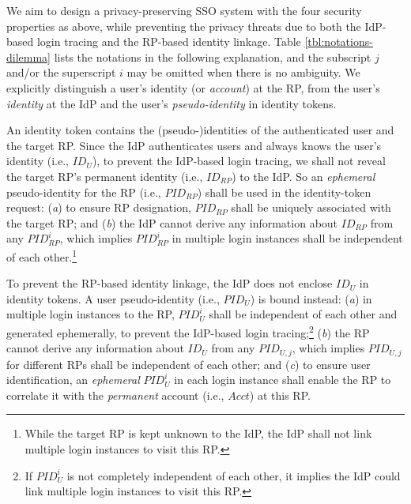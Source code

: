We aim to design a privacy-preserving SSO system with the four security properties as above,
    while preventing the privacy threats due to both the IdP-based login tracing and the RP-based identity linkage.
Table \ref{tbl:notations-dilemma} lists the notations in the following explanation,
    and the subscript $j$ and/or the superscript $i$ may be omitted when there is no ambiguity.
We explicitly distinguish a user's identity (or \emph{account}) at the RP, 
     from the user's \emph{identity} at the IdP and the user's \emph{pseudo-identity} in identity tokens.

An identity token contains the (pseudo-)identities of the authenticated user and the target RP. %
Since the IdP authenticates users and always knows the user's identity (i.e., $ID_U$),
    to prevent the IdP-based login tracing,
    we shall not reveal the target RP's permanent identity (i.e., $ID_{RP}$) to the IdP.
So an \emph{ephemeral} pseudo-identity for the RP (i.e., $PID_{RP}$) shall be used in the identity-token request:
(\emph{a}) to ensure RP designation,
     $PID_{RP}$ shall be uniquely associated with the target RP;
    and (\emph{b}) the IdP cannot derive any information about $ID_{RP}$ from any $PID_{RP}^i$,
        which implies $PID_{RP}^i$ in multiple login instances shall
         be independent of each other.\footnote{While the target RP is kept unknown to the IdP,
            the IdP shall not link multiple login instances to visit this RP.}

To prevent the RP-based identity linkage,
 the IdP does not enclose $ID_U$ in identity tokens.
A user pseudo-identity (i.e., $PID_U$) is bound instead:
    (\emph{a}) in multiple login instances to the RP, $PID_U^i$ shall be independent of each other and generated ephemerally,
        to prevent the IdP-based login tracing;\footnote{If $PID_U^i$ is not completely independent of each other,
         it implies the IdP could link multiple login instances to visit this RP.}
    (\emph{b}) the RP cannot derive any information about $ID_U$ from any $PID_{U,j}$,
    which implies $PID_{U,j}$ for different RPs shall be independent of each other;
    and (\emph{c}) to ensure user identification,
    an \emph{ephemeral} $PID_{U}^i$ in each login instance shall enable the RP to correlate it
     with the \emph{permanent} account  (i.e., $Acct$) at this RP.


